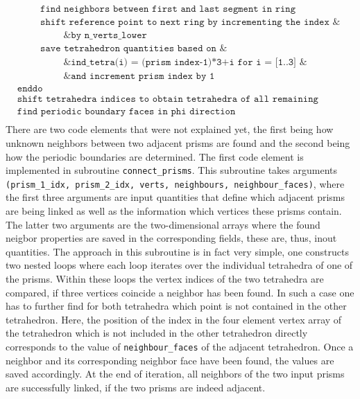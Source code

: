 \documentclass[./main.tex]{subfiles}
\begin{document}
\begin{align*}
&\hspace{1cm} \texttt{find neighbors between first and last segment in ring}\nonumber\\
&\hspace{1cm} \texttt{shift reference point to next ring by incrementing the index \&}\nonumber\\
&\hspace{2cm} \texttt{\& by n\_verts\_lower}\nonumber\\
&\hspace{1cm} \texttt{save tetrahedron quantities based on \&}\nonumber\\
&\hspace{2cm} \texttt{\& ind\_tetra(i) = (prism index-1)*3+i for i = [1..3] \&}\nonumber\\
&\hspace{2cm} \texttt{\& and increment prism index by 1}\nonumber\\
&\texttt{enddo}\nonumber\\
&\texttt{shift tetrahedra indices to obtain tetrahedra of all remaining slices}\nonumber\\
&\texttt{find periodic boundary faces in phi direction}\nonumber\\
\end{align*}
There are two code elements that were not explained yet, the first being how unknown neighbors between two adjacent prisms are found and the second being how the periodic boundaries are determined.
The first code element is implemented in subroutine \texttt{connect\_prisms}. This subroutine takes arguments \texttt{(prism\_1\_idx, prism\_2\_idx, verts, neighbours, neighbour\_faces)}, where the first three arguments are input quantities that define which adjacent prisms are being linked as well as the information which vertices these prisms contain. The latter two arguments are the two-dimensional arrays where the found neigbor properties are saved in the corresponding fields, these are, thus, inout quantities.
The approach in this subroutine is in fact very simple, one constructs two nested loops where each loop iterates over the individual tetrahedra of one of the prisms. Within these loops the vertex indices of the two tetrahedra are compared, if three vertices coincide a neighbor has been found. In such a case one has to further find for both tetrahedra which point is not contained in the other tetrahedron. Here, the position of the index in the four element vertex array of the tetrahedron which is not included in the other tetrahedron directly corresponds to the value of \texttt{neighbour\_faces} of the adjacent tetrahedron. Once a neighbor and its corresponding neighbor face have been found, the values are saved accordingly. At the end of iteration, all neighbors of the two input prisms are successfully linked, if the two prisms are indeed adjacent.\\
\end{document}
